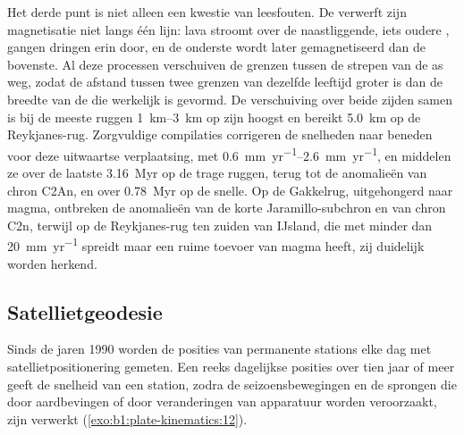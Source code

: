 Het derde punt is niet alleen een kwestie van leesfouten. De  verwerft zijn magnetisatie niet langs één lijn: lava stroomt over de naastliggende, iets oudere , gangen dringen erin door, en de onderste  wordt later gemagnetiseerd dan de bovenste. Al deze processen verschuiven de grenzen tussen de strepen van de as weg, zodat de afstand tussen twee grenzen van dezelfde leeftijd groter is dan de breedte van de  die werkelijk is gevormd. De verschuiving over beide zijden samen is bij de meeste ruggen \qtyrange{1}{3}{km} op zijn hoogst en bereikt \qty{5.0}{km} op de Reykjanes-rug. Zorgvuldige compilaties corrigeren de snelheden naar beneden voor deze uitwaartse verplaatsing, met \qtyrange{0.6}{2.6}{mm.yr^{-1}}, en middelen ze over de laatste \qty{3.16}{Myr} op de trage ruggen, terug tot de anomalieën van chron C2An, en over \qty{0.78}{Myr} op de snelle. Op de Gakkelrug, uitgehongerd naar magma, ontbreken de anomalieën van de korte Jaramillo-subchron en van chron C2n, terwijl op de Reykjanes-rug ten zuiden van IJsland, die met minder dan \qty{20}{mm.yr^{-1}} spreidt maar een ruime toevoer van magma heeft, zij duidelijk worden herkend.

\subsection*{Satellietgeodesie}

Sinds de jaren 1990 worden de posities van permanente stations elke dag met satellietpositionering gemeten. Een reeks dagelijkse posities over tien jaar of meer geeft de snelheid van een station, zodra de seizoensbewegingen en de sprongen die door aardbevingen of door veranderingen van apparatuur worden veroorzaakt, zijn verwerkt (\cref{exo:b1:plate-kinematics:12}).

